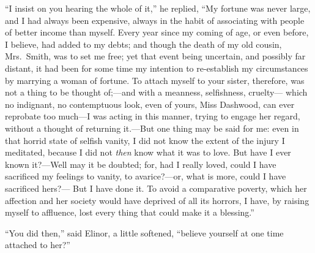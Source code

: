 \documentclass{article}
\begin{document}
``I insist on you hearing the whole of it,'' he replied,
``My fortune was never large, and I had always been expensive,
always in the habit of associating with people of better
income than myself.  Every year since my coming of age,
or even before, I believe, had added to my debts; and though
the death of my old cousin, Mrs.\ Smith, was to set me free;
yet that event being uncertain, and possibly far distant,
it had been for some time my intention to re-establish my
circumstances by marrying a woman of fortune.  To attach
myself to your sister, therefore, was not a thing to be
thought of;---and with a meanness, selfishness, cruelty---%
which no indignant, no contemptuous look, even of yours,
Miss Dashwood, can ever reprobate too much---I was acting
in this manner, trying to engage her regard, without a
thought of returning it.---But one thing may be said
for me: even in that horrid state of selfish vanity,
I did not know the extent of the injury I meditated,
because I did not \emph{then} know what it was to love.
But have I ever known it?---Well may it be doubted; for, had I
really loved, could I have sacrificed my feelings to vanity,
to avarice?---or, what is more, could I have sacrificed hers?---%
But I have done it.  To avoid a comparative poverty,
which her affection and her society would have deprived
of all its horrors, I have, by raising myself to affluence,
lost every thing that could make it a blessing.''

``You did then,'' said Elinor, a little softened,
``believe yourself at one time attached to her?''
\end{document}
